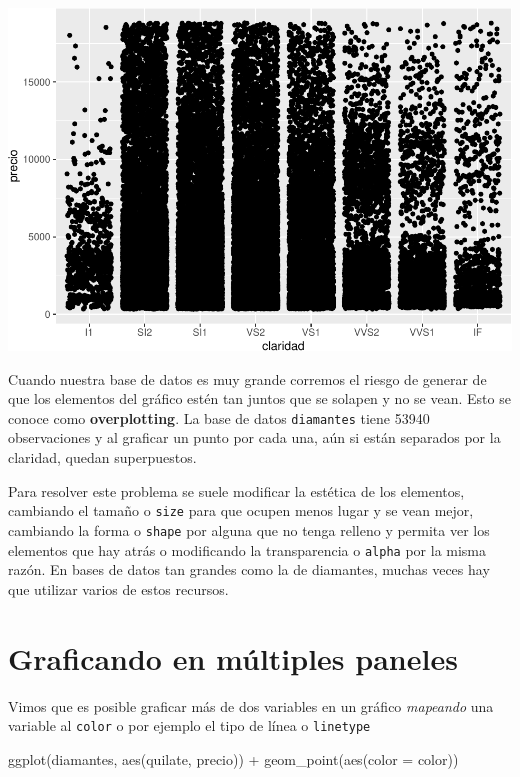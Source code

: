 \documentclass[
  openany]{book}
\newenvironment{Shaded}{\begin{snugshade}}{\end{snugshade}}
\newcommand{\AttributeTok}[1]{\textcolor[rgb]{0.77,0.63,0.00}{#1}}
\newcommand{\FunctionTok}[1]{\textcolor[rgb]{0.00,0.00,0.00}{#1}}
\newcommand{\NormalTok}[1]{#1}
\newcommand{\SpecialCharTok}[1]{\textcolor[rgb]{0.00,0.00,0.00}{#1}}
\begin{document}
\begin{center}\includegraphics[width=1\linewidth]{DT6_files/figure-latex/unnamed-chunk-70-1} \end{center}

Cuando nuestra base de datos es muy grande corremos el riesgo de generar de que los elementos del gráfico estén tan juntos que se solapen y no se vean.
Esto se conoce como \textbf{overplotting}.
La base de datos \texttt{diamantes} tiene 53940 observaciones y al graficar un punto por cada una, aún si están separados por la claridad, quedan superpuestos.

Para resolver este problema se suele modificar la estética de los elementos, cambiando el tamaño o \texttt{size} para que ocupen menos lugar y se vean mejor, cambiando la forma o \texttt{shape} por alguna que no tenga relleno y permita ver los elementos que hay atrás o modificando la transparencia o \texttt{alpha} por la misma razón.
En bases de datos tan grandes como la de diamantes, muchas veces hay que utilizar varios de estos recursos.

\hypertarget{graficando-en-muxfaltiples-paneles}{%
\section{Graficando en múltiples paneles}\label{graficando-en-muxfaltiples-paneles}}

Vimos que es posible graficar más de dos variables en un gráfico \emph{mapeando} una variable al \texttt{color} o por ejemplo el tipo de línea o \texttt{linetype}

\begin{Shaded}
\begin{Highlighting}[]
\FunctionTok{ggplot}\NormalTok{(diamantes, }\FunctionTok{aes}\NormalTok{(quilate, precio)) }\SpecialCharTok{+}
  \FunctionTok{geom\_point}\NormalTok{(}\FunctionTok{aes}\NormalTok{(}\AttributeTok{color =}\NormalTok{ color))}
\end{Highlighting}
\end{Shaded}
\end{document}
